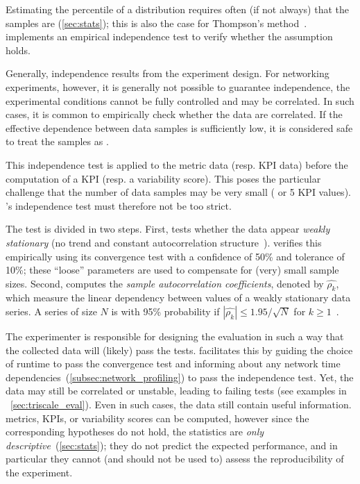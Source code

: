 Estimating the percentile of a distribution requires often (if not always) that the samples are \iid (\cref{sec:stats}); this is also the case for Thompson's method~\cite{thompson1936Confidence}.
\triscale implements an empirical independence test to verify whether the \iid assumption holds.

\begin{remark}
  Generally, independence results from the experiment design. For networking experiments, however, it is generally not possible to guarantee independence, \eg the experimental conditions cannot be fully controlled and may be correlated.
  In such cases, it is common to empirically check whether the data are correlated. If the effective dependence between data samples is sufficiently low, it is considered safe to treat the samples as \iid.
\end{remark}

This independence test is applied to the metric data (resp. KPI data) before the computation of a KPI (resp. a variability score).
This poses the particular challenge that the number of data samples may be very small ( or 5 KPI values). \triscale's independence test must therefore not be too strict.

The test is divided in two steps. First, \triscale tests whether the data appear \emph{weakly stationary} (\ie no trend and constant autocorrelation structure~\cite{brockwell1991Time}). \triscale verifies this empirically using its convergence test with a confidence of 50\% and tolerance of 10\%; these ``loose'' parameters are used to compensate for (very) small sample sizes.
Second, \triscale computes the \emph{sample autocorrelation coefficients}, denoted by $\widehat{\rho_k}$, which measure the linear dependency between values of a weakly stationary data series.
A series of size $N$ is \iid with 95\% probability if $|\widehat{\rho_k}| \leq 1.95/\sqrt{N}$ for $k \geq 1$~\cite{brockwell1991Time}.

The experimenter is responsible for designing the evaluation in such a way that the collected data will (likely) pass the tests.
\triscale facilitates this by guiding the choice of runtime to pass the convergence test and informing about any network time dependencies~(\cref{subsec:network_profiling}) to pass the independence test.
Yet, the data may still be correlated or unstable, leading to failing tests (see examples in ~\cref{sec:triscale_eval}).
Even in such cases, the data still contain useful information.
\triscale metrics, KPIs, or variability scores can be computed, however since the corresponding hypotheses do not hold, the statistics are \emph{only descriptive}~(\cref{sec:stats}); they do not predict the expected performance, and in particular they cannot (and should not be used to) assess the reproducibility of the experiment.

